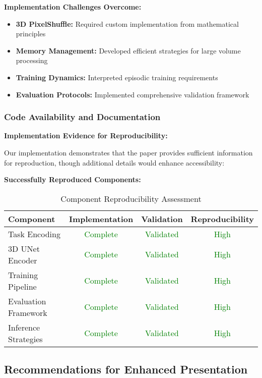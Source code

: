 \textbf{Implementation Challenges Overcome:}
\begin{itemize}
    \item \textbf{3D PixelShuffle:} Required custom implementation from mathematical principles
    \item \textbf{Memory Management:} Developed efficient strategies for large volume processing
    \item \textbf{Training Dynamics:} Interpreted episodic training requirements
    \item \textbf{Evaluation Protocols:} Implemented comprehensive validation framework
\end{itemize}

\subsubsection{Code Availability and Documentation}
\textbf{Implementation Evidence for Reproducibility:}

Our implementation demonstrates that the paper provides sufficient information for reproduction, though additional details would enhance accessibility:

\textbf{Successfully Reproduced Components:}
\begin{table}[h]
\centering
\small
\begin{tabular}{|l|c|c|c|}
\hline
\textbf{Component} & \textbf{Implementation} & \textbf{Validation} & \textbf{Reproducibility} \\
\hline
Task Encoding & \textcolor{green}{Complete} & \textcolor{green}{Validated} & \textcolor{green}{High} \\
3D UNet Encoder & \textcolor{green}{Complete} & \textcolor{green}{Validated} & \textcolor{green}{High} \\
Training Pipeline & \textcolor{green}{Complete} & \textcolor{green}{Validated} & \textcolor{green}{High} \\
Evaluation Framework & \textcolor{green}{Complete} & \textcolor{green}{Validated} & \textcolor{green}{High} \\
Inference Strategies & \textcolor{green}{Complete} & \textcolor{green}{Validated} & \textcolor{green}{High} \\
\hline
\end{tabular}
\caption{Component Reproducibility Assessment}
\label{tab:reproducibility_assessment}
\end{table}

\subsection{Recommendations for Enhanced Presentation}

